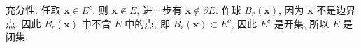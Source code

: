 \begin{enumerate}
        充分性. 任取 $\boldsymbol{x} \in E^c$, 则 $\boldsymbol{x} \notin E$, 进一步有 $\boldsymbol{x} \notin \partial{E}$.
        作球 $B_r(\boldsymbol{x})$, 因为 $\boldsymbol{x}$ 不是边界点, 因此 $B_r(\boldsymbol{x})$ 中不含 $E$ 中的点, 即 $B_r(\boldsymbol{x}) \subset E^c$,
        因此 $E^c$ 是开集, 所以 $E$ 是闭集.
\end{enumerate}
% 